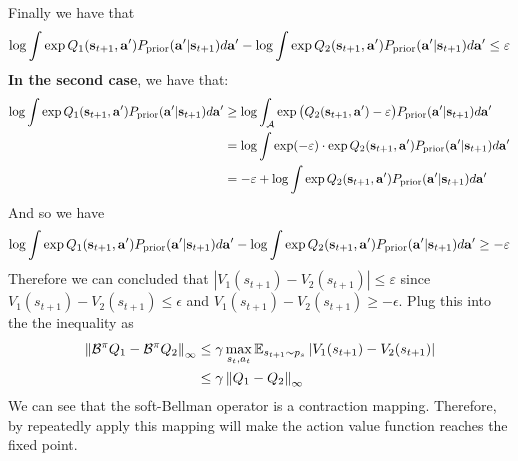 Finally we have that 
\begin{equation*}
    \log \int \exp Q_1(\bold{s}_{t+1}, \bold{a}') P_{\text{prior}} (\bold{a}' | \bold{s}_{t+1}) d\bold{a}' - \log \int \exp Q_2(\bold{s}_{t+1}, \bold{a}')P_{\text{prior}} (\bold{a}' | \bold{s}_{t+1}) d\bold{a}' \le \varepsilon
\end{equation*}
\textbf{In the second case}, we have that:
\begin{equation*}
    \begin{aligned}
        \log \int \exp Q_1(\bold{s}_{t+1}, \bold{a}') P_{\text{prior}} (\bold{a}' | \bold{s}_{t+1}) d\bold{a}' &\ge \log \int_{\mathcal{A}} \exp \big(Q_2(\bold{s}_{t+1}, \bold{a}') - \varepsilon \big) P_{\text{prior}} (\bold{a}' | \bold{s}_{t+1}) d\bold{a}' \\ 
        &= \log \int \exp (-\varepsilon) \cdot \exp Q_2(\bold{s}_{t+1}, \bold{a}') P_{\text{prior}} (\bold{a}' | \bold{s}_{t+1}) d\bold{a}' \\ 
        &= -\varepsilon + \log \int \exp Q_2(\bold{s}_{t+1}, \bold{a}')P_{\text{prior}} (\bold{a}' | \bold{s}_{t+1}) d\bold{a}'
    \end{aligned}
\end{equation*}
And so we have
\begin{equation*}
    \log \int \exp Q_1(\bold{s}_{t+1}, \bold{a}') P_{\text{prior}} (\bold{a}' | \bold{s}_{t+1}) d\bold{a}' - \log \int \exp Q_2(\bold{s}_{t+1}, \bold{a}')P_{\text{prior}} (\bold{a}' | \bold{s}_{t+1}) d\bold{a}' \ge -\varepsilon
\end{equation*}
Therefore we can concluded that $\left| V_1(s_{t+1})- V_2(s_{t+1}) \right| \le \varepsilon$ since $V_1(s_{t+1}) - V_2(s_{t+1}) \le \epsilon$ and $V_1(s_{t+1}) - V_2(s_{t+1}) \ge -\epsilon$. Plug this into the the inequality as 
\begin{equation*}
    \begin{aligned}
        \left\lVert\mathcal{B}^{\pi} Q_1 - \mathcal{B}^{\pi} Q_2\right\rVert_{\infty} &\le \gamma \max_{s_t, a_t}\mathbb{E}_{s_{t+1} \sim p_{s}} \left| V_1(s_{t+1})- V_2(s_{t+1}) \right| \\
        &\le \gamma \left\lVert Q_1 - Q_2\right\rVert_{\infty}
    \end{aligned}
\end{equation*}
We can see that the soft-Bellman operator is a contraction mapping. Therefore, by repeatedly apply this mapping will make the action value function reaches the fixed point.

